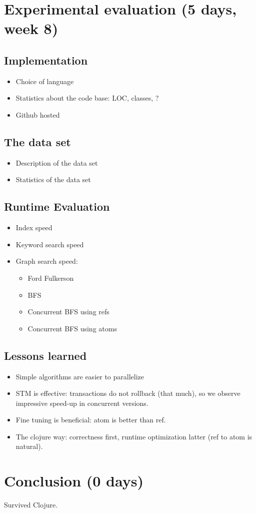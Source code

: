 \documentclass[grad]{uoit-thesis}
\begin{document}
	\chapter{Experimental evaluation (5 days, week 8)}
		\section{Implementation}
			\begin{itemize}
				\item Choice of language
				\item Statistics about the code base: LOC, classes, ?
				\item Github hosted
			\end{itemize}

		\section{The data set}
			\begin{itemize}
				\item Description of the data set
				\item Statistics of the data set
			\end{itemize}

		\section{Runtime Evaluation}
			\begin{itemize}
				\item Index speed
				\item Keyword search speed
				\item Graph search speed:
					\begin{itemize}
						\item Ford Fulkerson
						\item BFS
						\item Concurrent BFS using refs
						\item Concurrent BFS using atoms
					\end{itemize}
			\end{itemize}

		\section{Lessons learned}
			\begin{itemize}
				\item Simple algorithms are easier to parallelize
				\item STM is effective: transactions do not rollback (that much), so we observe impressive speed-up in concurrent versions.
				\item Fine tuning is beneficial: atom is better than ref.
				\item The clojure way: correctness first, runtime optimization latter (ref to atom is natural).
			\end{itemize}

			\chapter{Conclusion (0 days)}
				Survived Clojure.

	\appendix
	
	
	\printbibliography
	
	\todos
\end{document}
